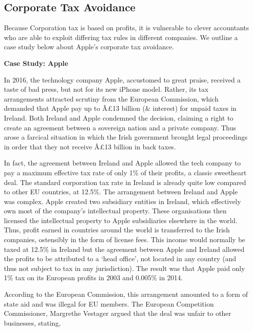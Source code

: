 \documentclass[]{tufte-handout}
\begin{document}
\hypertarget{corporate-tax-avoidance}{%
\subsection{Corporate Tax Avoidance}\label{corporate-tax-avoidance}}

Because Corporation tax is based on profits, it is vulnerable to clever
accountants who are able to exploit differing tax rules in different
companies. We outline a case study below about Apple's corporate tax
avoidance.

\textbf{Case Study: Apple}

In 2016, the technology company Apple, accustomed to great praise,
received a taste of bad press, but not for its new iPhone model. Rather,
its tax arrangements attracted scrutiny from the European Commission,
which demanded that Apple pay up to Â£13 billion (\& interest) for
unpaid taxes in Ireland. Both Ireland and Apple condemned the decision,
claiming a right to create an agreement between a sovereign nation and a
private company. Thus arose a farcical situation in which the Irish
government brought legal proceedings in order that they not receive Â£13
billion in back taxes.

In fact, the agreement between Ireland and Apple allowed the tech
company to pay a maximum effective tax rate of only 1\% of their
profits, a classic sweetheart deal. The standard corporation tax rate in
Ireland is already quite low compared to other EU countries, at 12.5\%.
The arrangement between Ireland and Apple was complex. Apple created two
subsidiary entities in Ireland, which effectively own most of the
company's intellectual property. These organisations then licensed the
intellectual property to Apple subsidiaries elsewhere in the world.
Thus, profit earned in countries around the world is transferred to the
Irish companies, ostensibly in the form of license fees. This income
would normally be taxed at 12.5\% in Ireland but the agreement between
Apple and Ireland allowed the profits to be attributed to a `head
office', not located in any country (and thus not subject to tax in any
jurisdiction). The result was that Apple paid only 1\% tax on its
European profits in 2003 and 0.005\% in 2014.

According to the European Commission, this arrangement amounted to a
form of state aid and was illegal for EU members. The European
Competition Commissioner, Margrethe Vestager argued that the deal was
unfair to other businesses, stating,
\end{document}
